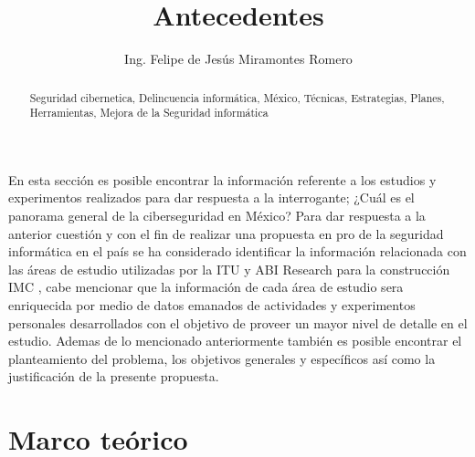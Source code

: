 \documentclass[runningheads,a4paper]{llncs}
\newcommand{\keywords}[1]{\par\addvspace\baselineskip
\noindent\keywordname\enspace\ignorespaces#1}
\begin{document}
\mainmatter  
\title{Antecedentes}
\author{Ing. Felipe de Jesús Miramontes Romero}
\maketitle

\begin{abstract}
\keywords{Seguridad cibernetica, Delincuencia informática, México, Técnicas, Estrategias, Planes, Herramientas, Mejora de la Seguridad informática}
\end{abstract}

En esta sección es posible encontrar la información referente a los estudios y experimentos realizados para dar respuesta a la interrogante; ¿Cuál es el panorama general de la ciberseguridad en México? Para dar respuesta a la anterior cuestión y con el fin de realizar una propuesta en pro de la seguridad informática en el país se ha considerado identificar la información relacionada con las áreas de estudio utilizadas por la \gls{ITU} y ABI Research para la construcción \gls{IMC} \cite{GCSI_1}, cabe mencionar que la información de cada área de estudio sera enriquecida por medio de datos emanados de actividades y experimentos personales desarrollados con el objetivo de proveer un mayor nivel de detalle en el estudio. Ademas de lo mencionado anteriormente también es posible encontrar el planteamiento del problema, los objetivos generales y específicos así como la justificación de la presente propuesta.

\section{Marco teórico}
\end{document}
